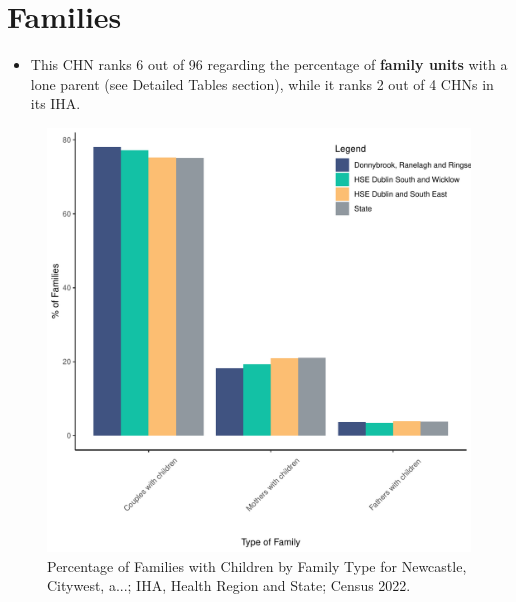 \documentclass{article}
\begin{document}
\section{Families}\label{sect:Fam}
\begin{itemize}
\item This CHN ranks  6 out of 96 regarding the percentage of \textbf{family units} with a lone parent (see Detailed Tables section), while it ranks   2 out of 4 CHNs in its IHA.
\end{itemize}
\begin{figure}[H]
	\centering
	\includegraphics[width = 150mm]{../figures/FamED.pdf}
	\caption{Percentage of Families with Children by Family Type for Newcastle, Citywest, a...; IHA, Health Region and State; Census 2022.}
	\label{fig:vbnv}
	\end{figure}
	
\end{document}
